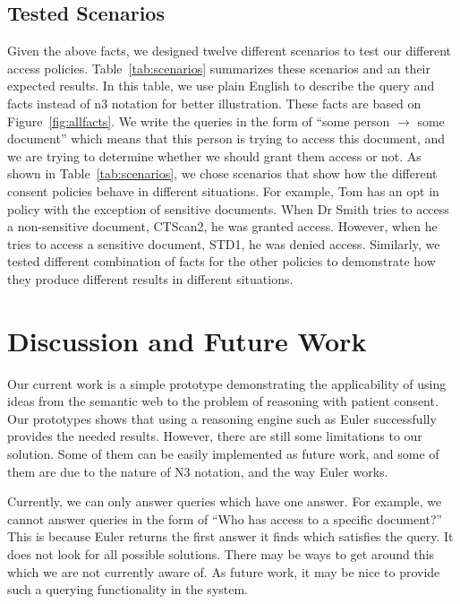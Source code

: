 \documentclass[conference]{IEEEtran}
\begin{document}
\subsection{Tested Scenarios}

Given the above facts, we designed twelve different scenarios to test our different access policies. Table~\ref{tab:scenarios} summarizes these scenarios and
an their expected results. In this table, we use plain English to describe the query and facts instead of n3 notation for better illustration. These facts are
based on Figure~\ref{fig:allfacts}. We write the queries in the form of ``some person $\rightarrow$ some document'' which means that this person is trying to
access this document, and we are trying to determine whether we should grant them access or not. As shown in Table~\ref{tab:scenarios}, we chose scenarios that
show how the different consent policies behave in different situations. For example, Tom has an opt in policy with the exception of sensitive documents. When
Dr Smith tries to access a non-sensitive document, CTScan2, he was granted access. However, when he tries to access a sensitive document, STD1, he was denied
access. Similarly, we tested different combination of facts for the other policies to demonstrate how they produce different results in different situations.


\section{Discussion and Future Work}
\label{sec:discFuture}

Our current work is a simple prototype demonstrating the applicability of using ideas from the semantic web to the problem of reasoning with patient consent.
Our prototypes shows that using a reasoning engine such as Euler successfully provides the needed results. However, there are still some limitations to our
solution. Some of them can be easily implemented as future work, and some of them are due to the nature of N3 notation, and the way Euler works. 

Currently, we can only answer queries which have one answer. For example, we cannot answer queries in the form of ``Who has access to a specific document?''
This is because
Euler returns the first answer it finds which satisfies the query. It does not look for all possible solutions. There may be ways to get around this which we
are not currently aware of. As future work, it may be nice to provide such a querying functionality in the system.
\end{document}
